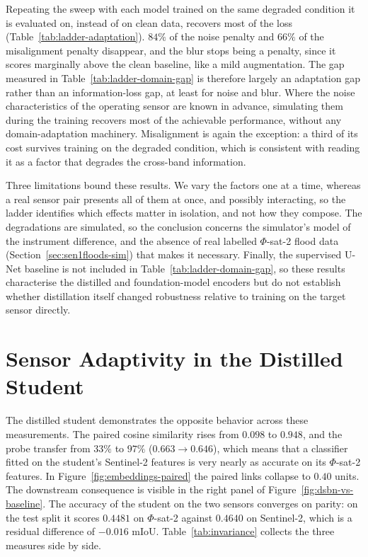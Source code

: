 Repeating the sweep with each model trained on the same degraded condition it is evaluated on, instead of on clean data, recovers most of the loss (Table~\ref{tab:ladder-adaptation}).
$84\%$ of the noise penalty and $66\%$ of the misalignment penalty disappear, and the blur stops being a penalty, since it scores marginally above the clean baseline, like a mild augmentation.
The gap measured in Table~\ref{tab:ladder-domain-gap} is therefore largely an adaptation gap rather than an information-loss gap, at least for noise and blur.
Where the noise characteristics of the operating sensor are known in advance, simulating them during the training recovers most of the achievable performance, without any domain-adaptation machinery.
Misalignment is again the exception: a third of its cost survives training on the degraded condition, which is consistent with reading it as a factor that degrades the cross-band information.

Three limitations bound these results.
We vary the factors one at a time, whereas a real sensor pair presents all of them at once, and possibly interacting, so the ladder identifies which effects matter in isolation, and not how they compose.
The degradations are simulated, so the conclusion concerns the simulator's model of the instrument difference, and the absence of real labelled $\Phi$-sat-2 flood data (Section~\ref{sec:sen1floods-sim}) that makes it necessary.
Finally, the supervised U-Net baseline is not included in Table~\ref{tab:ladder-domain-gap}, so these results characterise the distilled and foundation-model encoders but do not establish whether distillation itself changed robustness relative to training on the target sensor directly.

\section{Sensor Adaptivity in the Distilled Student}
\label{sec:rq2-results}

The distilled student demonstrates the opposite behavior across these measurements.
The paired cosine similarity rises from $0.098$ to $0.948$, and the probe transfer from $33\%$ to $97\%$ ($0.663 \rightarrow 0.646$), which means that a classifier fitted on the student's Sentinel-2 features is very nearly as accurate on its $\Phi$-sat-2 features.
In Figure~\ref{fig:embeddings-paired} the paired links collapse to $0.40$  units.
The downstream consequence is visible in the right panel of Figure~\ref{fig:dsbn-vs-baseline}.
The accuracy of the student on the two sensors converges on parity: on the test split it scores $0.4481$ on $\Phi$-sat-2 against $0.4640$ on Sentinel-2, which is a residual difference of $-0.016$ mIoU.
Table~\ref{tab:invariance} collects the three measures side by side.

